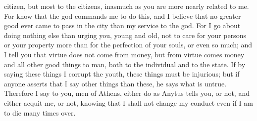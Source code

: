citizen, but most to the citizens, inasmuch as you are more nearly related to me. For know that the god commands me to do this, and I believe that no greater good ever came to pass in the city than my service to the god. For I go about doing nothing else than urging you, young and old, not to care for your persons or your property  more than for the perfection of your souls, or even so much; and I tell you that virtue does not come from money, but from virtue comes money and all other good things to man, both to the individual and to the state. If by saying these things I corrupt the youth, these things must be injurious; but if anyone asserts that I say other things than these, he says what is untrue. Therefore I say to you, men of Athens, either do as Anytus tells you, or not, and either acquit me, or not, knowing that I shall not change my conduct even if I am  to die many times over.

